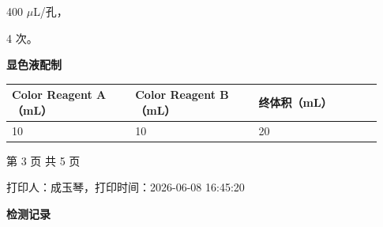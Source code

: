 \documentclass[UTF8,10pt,a4paper,fontset=fandol]{ctexart}
\newcommand{\fieldvalue}[1]{#1}
\newcommand{\handwritten}[1]{#1}
\begin{document}
\fieldvalue{\handwritten{400}} $\mu$L/孔，

\fieldvalue{\handwritten{4}} 次。

\vspace{2mm}

\begin{center}
\textbf{显色液配制}
\end{center}

\begin{tabular}{|p{0.31\linewidth}|p{0.31\linewidth}|p{0.31\linewidth}|}
\hline
Color Reagent A（mL） & Color Reagent B（mL） & 终体积（mL） \\
\hline
\fieldvalue{\handwritten{10}} &
\fieldvalue{\handwritten{10}} &
\fieldvalue{\handwritten{20}} \\
\hline
\end{tabular}

\vfill

\begin{center}
第 3 页 共 5 页

\vspace{3mm}

打印人：成玉琴，打印时间：2026-06-08 16:45:20
\end{center}

\newpage

\begin{center}
\textbf{检测记录}
\end{center}
\end{document}

